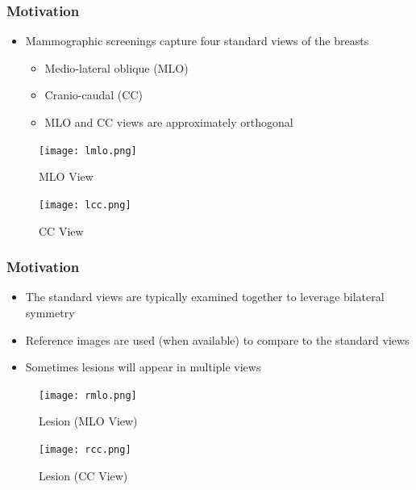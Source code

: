 \documentclass{beamer}
\begin{document}
\begin{frame}
   \frametitle{Motivation}
   \begin{itemize}
        \item Mammographic screenings capture four standard views of the breasts 
        \begin{itemize}
            \item Medio-lateral oblique (MLO)
            \item Cranio-caudal (CC)
            \item MLO and CC views are approximately orthogonal
        \end{itemize}
   \end{itemize}
\end{frame}
\begin{frame}
   \begin{figure}
       \centering
       \begin{minipage}{0.45\textwidth}
           \centering
           \texttt{[image: lmlo.png]}
           \caption{MLO View}
       \end{minipage}\hfill
       \begin{minipage}{0.45\textwidth}
           \centering
           \texttt{[image: lcc.png]}
           \caption{CC View}
       \end{minipage}
   \end{figure}
\end{frame}

\begin{frame}
   \frametitle{Motivation}
   \begin{itemize}
        \item The standard views are typically examined together to leverage bilateral symmetry
        \item Reference images are used (when available) to compare to the standard views
        \item Sometimes lesions will appear in multiple views
   \end{itemize}
\end{frame}
\begin{frame}
   \begin{figure}
       \centering
       \begin{minipage}{0.45\textwidth}
           \centering
           \texttt{[image: rmlo.png]}
           \caption{Lesion (MLO View)}
       \end{minipage}\hfill
       \begin{minipage}{0.45\textwidth}
           \centering
           \texttt{[image: rcc.png]}
           \caption{Lesion (CC View)}
       \end{minipage}
   \end{figure}
\end{frame}
\end{document}

